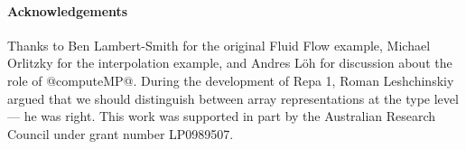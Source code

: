 \documentclass{sigplanconf}
\begin{document}
\eject
\paragraph{Acknowledgements}
Thanks to Ben Lambert-Smith for the original Fluid Flow example, Michael Orlitzky for the interpolation example, and Andres L\"{o}h for discussion about the role of @computeMP@. During the development of Repa 1, Roman Leshchinskiy argued that we should distinguish between array representations at the type level --- he was right. This work was supported in part by the Australian Research Council under grant number LP0989507. 




\clearpage{}
\end{document}

